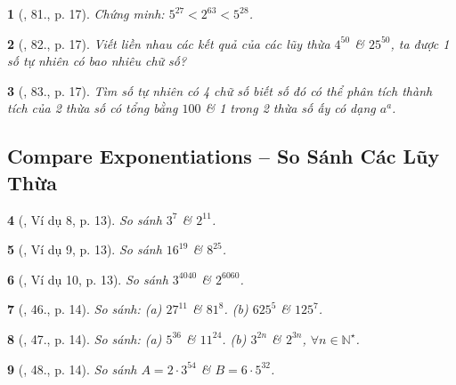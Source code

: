 \documentclass{article}
\newtheorem{baitoan}{}
\begin{document}
\begin{baitoan}[\cite{Binh_Toan_6_tap_1}, 81., p. 17]
	 Chứng minh: $5^{27} < 2^{63} < 5^{28}$.
\end{baitoan}

\begin{baitoan}[\cite{Binh_Toan_6_tap_1}, 82., p. 17]
	Viết liền nhau các kết quả của các lũy thừa $4^{50}$ \& $25^{50}$, ta được 1 số tự nhiên có bao nhiêu chữ số?
\end{baitoan}

\begin{baitoan}[\cite{Binh_Toan_6_tap_1}, 83., p. 17]
	Tìm số tự nhiên có 4 chữ số biết số đó có thể phân tích thành tích của 2 thừa số có tổng bằng $100$ \& 1 trong 2 thừa số ấy có dạng $a^a$.
\end{baitoan}


\subsection{Compare Exponentiations -- So Sánh Các Lũy Thừa}

\begin{baitoan}[\cite{Tuyen_Toan_6}, Ví dụ 8, p. 13]
	So sánh $3^7$ \& $2^{11}$.
\end{baitoan}

\begin{baitoan}[\cite{Tuyen_Toan_6}, Ví dụ 9, p. 13]
	So sánh $16^{19}$ \& $8^{25}$.
\end{baitoan}

\begin{baitoan}[\cite{Tuyen_Toan_6}, Ví dụ 10, p. 13]
	So sánh $3^{4040}$ \& $2^{6060}$.
\end{baitoan}

\begin{baitoan}[\cite{Tuyen_Toan_6}, 46., p. 14]
	So sánh: (a) $27^{11}$ \& $81^8$. (b) $625^5$ \& $125^7$.
\end{baitoan}

\begin{baitoan}[\cite{Tuyen_Toan_6}, 47., p. 14]
	So sánh: (a) $5^{36}$ \& $11^{24}$. (b) $3^{2n}$ \& $2^{3n}$, $\forall n\in\mathbb{N}^\star$.
\end{baitoan}

\begin{baitoan}[\cite{Tuyen_Toan_6}, 48., p. 14]
	So sánh $A = 2\cdot3^{54}$ \& $B = 6\cdot5^{32}$.
\end{baitoan}
\end{document}
